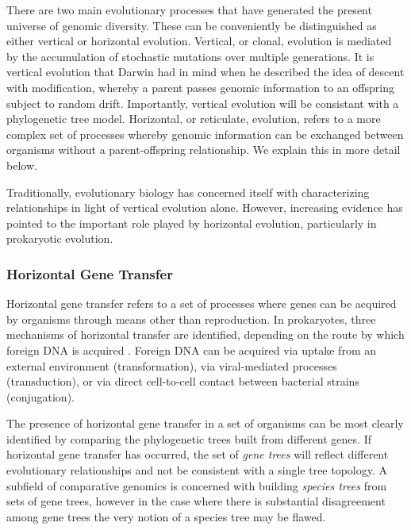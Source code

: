There are two main evolutionary processes that have generated the present universe of genomic diversity.
These can be conveniently be distinguished as either vertical or horizontal evolution.
Vertical, or clonal, evolution is mediated by the accumulation of stochastic mutations over multiple generations.
It is vertical evolution that Darwin had in mind when he described the idea of descent with modification, whereby a parent passes genomic information to an offspring subject to random drift.
Importantly, vertical evolution will be consistant with a phylogenetic tree model.
Horizontal, or reticulate, evolution, refers to a more complex set of processes whereby genomic information can be exchanged between organisms without a parent-offspring relationship.
We explain this in more detail below.

Traditionally, evolutionary biology has concerned itself with characterizing relationships in light of vertical evolution alone.
However, increasing evidence has pointed to the important role played by horizontal evolution, particularly in prokaryotic evolution.


\subsubsection{Horizontal Gene Transfer}

Horizontal gene transfer refers to a set of processes where genes can be acquired by organisms through means other than reproduction.
In prokaryotes, three mechanisms of horizontal transfer are identified, depending on the route by which foreign DNA is acquired \cite{Ochman:2000dr}.
Foreign DNA can be acquired via uptake from an external environment (transformation), via viral-mediated processes (transduction), or via direct cell-to-cell contact between bacterial strains (conjugation).

The presence of horizontal gene transfer in a set of organisms can be most clearly identified by comparing the phylogenetic trees built from different genes.
If horizontal gene transfer has occurred, the set of \emph{gene trees} will reflect different evolutionary relationships and not be consistent with a single tree topology.
A subfield of comparative genomics is concerned with building \emph{species trees} from sets of gene trees, however in the case where there is substantial disagreement among gene trees the very notion of a species tree may be flawed.


